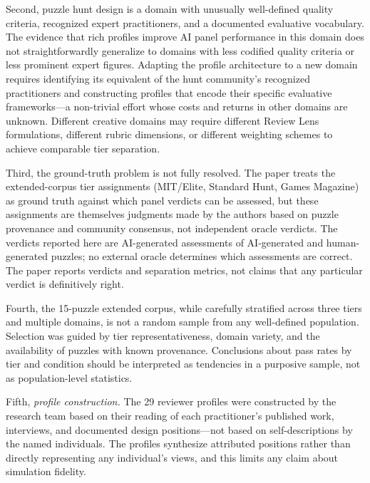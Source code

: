 Second, puzzle hunt design is a domain with unusually well-defined quality criteria, recognized
expert practitioners, and a documented evaluative vocabulary. The evidence that rich profiles
improve AI panel performance in this domain does not straightforwardly generalize to domains
with less codified quality criteria or less prominent expert figures. Adapting the profile
architecture to a new domain requires identifying its equivalent of the hunt community's
recognized practitioners and constructing profiles that encode their specific evaluative
frameworks---a non-trivial effort whose costs and returns in other domains are unknown.
Different creative domains may require different Review Lens formulations, different rubric
dimensions, or different weighting schemes to achieve comparable tier separation.

Third, the ground-truth problem is not fully resolved. The paper treats the extended-corpus
tier assignments (MIT/Elite, Standard Hunt, Games Magazine) as ground truth against which
panel verdicts can be assessed, but these assignments are themselves judgments made by the
authors based on puzzle provenance and community consensus, not independent oracle verdicts.
The verdicts reported here are AI-generated assessments of AI-generated and human-generated
puzzles; no external oracle determines which assessments are correct. The paper reports verdicts
and separation metrics, not claims that any particular verdict is definitively right.

Fourth, the 15-puzzle extended corpus, while carefully stratified across three tiers and
multiple domains, is not a random sample from any well-defined population. Selection was
guided by tier representativeness, domain variety, and the availability of puzzles with known
provenance. Conclusions about pass rates by tier and condition should be interpreted as
tendencies in a purposive sample, not as population-level statistics.

Fifth, \emph{profile construction.} The 29 reviewer profiles were constructed by the
research team based on their reading of each practitioner's published work, interviews,
and documented design positions---not based on self-descriptions by the named individuals.
The profiles synthesize attributed positions rather than directly representing any
individual's views, and this limits any claim about simulation fidelity.
